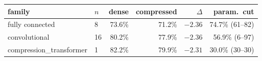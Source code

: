 \begin{tabular}{llrrrr}
\toprule
family & $n$ & dense & compressed & $\Delta$ & param.\ cut\\
\midrule
fully connected & 8 & 73.6\% & 71.2\% & $-2.36$ & 74.7\% (61--82)\\
convolutional & 16 & 80.2\% & 77.9\% & $-2.36$ & 56.9\% (6--97)\\
compression_transformer & 1 & 82.2\% & 79.9\% & $-2.31$ & 30.0\% (30--30)\\
\bottomrule
\end{tabular}
